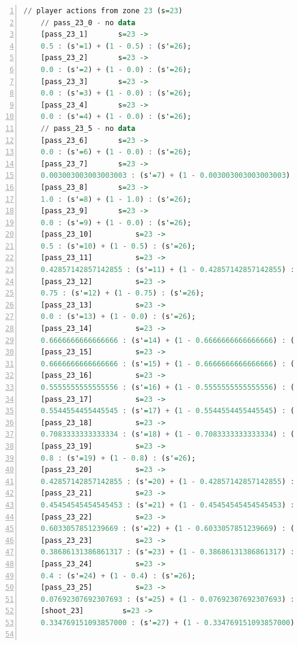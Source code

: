 \documentclass{l4proj}
\begin{document}
\begin{appendices}
\begin{lstlisting}[language=Haskell, numbers=left, caption=MDP used for strategy generation. This is the model specification as-is after the refinements at the end of chapter 3.]
	// player actions from zone 23 (s=23)
	// pass_23_0 - no data
	[pass_23_1]	      s=23 ->
	0.5 : (s'=1) + (1 - 0.5) : (s'=26);
	[pass_23_2]	      s=23 ->
	0.0 : (s'=2) + (1 - 0.0) : (s'=26);
	[pass_23_3]	      s=23 ->
	0.0 : (s'=3) + (1 - 0.0) : (s'=26);
	[pass_23_4]	      s=23 ->
	0.0 : (s'=4) + (1 - 0.0) : (s'=26);
	// pass_23_5 - no data
	[pass_23_6]	      s=23 ->
	0.0 : (s'=6) + (1 - 0.0) : (s'=26);
	[pass_23_7]	      s=23 ->
	0.003003003003003003 : (s'=7) + (1 - 0.003003003003003003) : (s'=26);
	[pass_23_8]	      s=23 ->
	1.0 : (s'=8) + (1 - 1.0) : (s'=26);
	[pass_23_9]	      s=23 ->
	0.0 : (s'=9) + (1 - 0.0) : (s'=26);
	[pass_23_10]	      s=23 ->
	0.5 : (s'=10) + (1 - 0.5) : (s'=26);
	[pass_23_11]	      s=23 ->
	0.42857142857142855 : (s'=11) + (1 - 0.42857142857142855) : (s'=26);
	[pass_23_12]	      s=23 ->
	0.75 : (s'=12) + (1 - 0.75) : (s'=26);
	[pass_23_13]	      s=23 ->
	0.0 : (s'=13) + (1 - 0.0) : (s'=26);
	[pass_23_14]	      s=23 ->
	0.6666666666666666 : (s'=14) + (1 - 0.6666666666666666) : (s'=26);
	[pass_23_15]	      s=23 ->
	0.6666666666666666 : (s'=15) + (1 - 0.6666666666666666) : (s'=26);
	[pass_23_16]	      s=23 ->
	0.5555555555555556 : (s'=16) + (1 - 0.5555555555555556) : (s'=26);
	[pass_23_17]	      s=23 ->
	0.5544554455445545 : (s'=17) + (1 - 0.5544554455445545) : (s'=26);
	[pass_23_18]	      s=23 ->
	0.7083333333333334 : (s'=18) + (1 - 0.7083333333333334) : (s'=26);
	[pass_23_19]	      s=23 ->
	0.8 : (s'=19) + (1 - 0.8) : (s'=26);
	[pass_23_20]	      s=23 ->
	0.42857142857142855 : (s'=20) + (1 - 0.42857142857142855) : (s'=26);
	[pass_23_21]	      s=23 ->
	0.45454545454545453 : (s'=21) + (1 - 0.45454545454545453) : (s'=26);
	[pass_23_22]	      s=23 ->
	0.6033057851239669 : (s'=22) + (1 - 0.6033057851239669) : (s'=26);
	[pass_23_23]	      s=23 ->
	0.38686131386861317 : (s'=23) + (1 - 0.38686131386861317) : (s'=26);
	[pass_23_24]	      s=23 ->
	0.4 : (s'=24) + (1 - 0.4) : (s'=26);
	[pass_23_25]	      s=23 ->
	0.07692307692307693 : (s'=25) + (1 - 0.07692307692307693) : (s'=26);
	[shoot_23]	       s=23 ->
	0.334769151093857000 : (s'=27) + (1 - 0.334769151093857000) : (s'=26);


\end{lstlisting}
\end{appendices}
\end{document}
